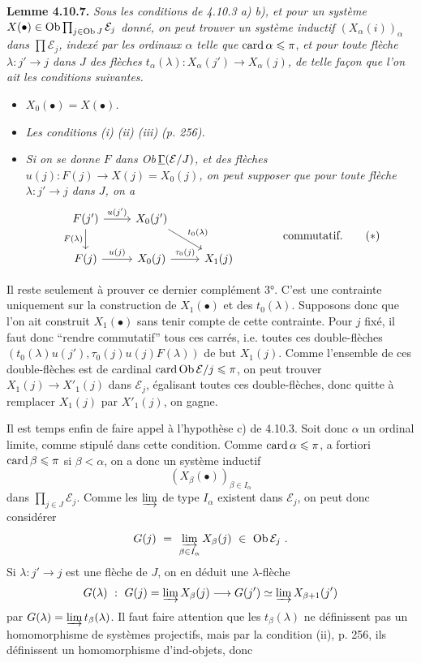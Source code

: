 \textbf{Lemme 4.10.7.} \textit{Sous les conditions de 4.10.3 a) b), et pour un système $X(\bullet)\in\operatorname{Ob}\prod_{j\in\operatorname{Ob} J}\mathcal{E}_j$ donné, on peut trouver un système inductif $(X_\alpha(i))_\alpha$ dans $\prod\mathcal{E}_j$, indexé par les ordinaux $\alpha$ telle que} $\operatorname{card}\alpha\leqslant\pi$, \textit{et pour toute flèche $\lambda : j'\longrightarrow j$ dans $J$ des flèches $t_\alpha(\lambda) : X_\alpha(j')\longrightarrow X_\alpha(j)$, de telle façon que l'on ait les conditions suivantes.} %
\begin{itemize}[leftmargin=3em]
\item[\textit{1°)}] \textit{$X_0(\bullet)=X(\bullet)$.}
\item[\textit{2°)}] \textit{Les conditions (i) (ii) (iii) (p. 256).}
\item[\textit{3°)}] \textit{Si on se donne $F$ dans \textup{Ob}$\,\underline{\Gamma}(\mathcal{E}/J)$, et des flèches $u(j) : F(j)\longrightarrow X(j)=X_0(j)$, on peut supposer que pour toute flèche $\lambda : j'\longrightarrow j$ dans $J$, on a}
\[
\begin{tikzcd}
F(j') \arrow[r,"u(j')"] \arrow[d,"F(\lambda)"'] & X_0(j') \arrow[dr,"t_0(\lambda)"] & \\
F(j) \arrow[r,"u(j)"] & X_0(j) \arrow[r,"\tau_0(j)"] & X_1(j)
\end{tikzcd}
\qquad\qquad \text{commutatif.}
\tag*{$(*)$}
\]
\end{itemize}

Il reste seulement à prouver ce dernier complément 3°. C'est une contrainte uniquement sur la construction de $X_1(\bullet)$ et des $t_0(\lambda)$. Supposons donc que l'on ait construit $X_1(\bullet)$ sans tenir compte de cette contrainte. Pour $j$ fixé, il faut donc “rendre commutatif” tous ces carrés, i.e. toutes ces double-flèches $(t_0(\lambda)u(j'),\tau_0(j)u(j)F(\lambda))$ de but $X_1(j)$. Comme l'ensemble de ces double-flèches est de cardinal $\operatorname{card}\operatorname{Ob}\mathcal{E}/j\leqslant\pi$, on peut trouver $X_1(j)\longrightarrow X'_1(j)$ dans $\mathcal{E}_j$, égalisant toutes ces double-flèches, donc quitte à remplacer $X_1(j)$ par $X'_1(j)$, on gagne.

Il est temps enfin de faire appel à l'hypothèse c) de 4.10.3. Soit donc $\alpha$ un ordinal limite, comme stipulé dans cette condition. Comme $\operatorname{card}\alpha\leqslant\pi$, a fortiori $\operatorname{card}\beta\leqslant\pi$ si $\beta<\alpha$, on a donc un système inductif
\[
(X_\beta(\bullet))_{\beta\in I_\alpha}
\]
dans $\prod_{j\in J}\mathcal{E}_j$. Comme les $\varinjlim$ de type $I_\alpha$ existent dans $\mathcal{E}_j$, on peut donc considérer
\[
G(j)\ =\ \varinjlim_{\beta\in I_\alpha} X_\beta(j)\ \in\ \Ob\mathcal{E}_j\ .
\]
Si $\lambda : j'\longrightarrow j$ est une flèche de $J$, on en déduit une $\lambda$-flèche
\[
G(\lambda)\ :\ G(j)=\varinjlim X_\beta(j) \longrightarrow G(j')\simeq\varinjlim X_{\beta+1}(j')
\]
par $G(\lambda)=\varinjlim t_\beta(\lambda)$. Il faut
faire attention que les $t_\beta(\lambda)$ ne définissent pas un homomorphisme de systèmes projectifs, mais par la condition (ii), p. 256, ils définissent un homomorphisme d'ind-objets, donc

